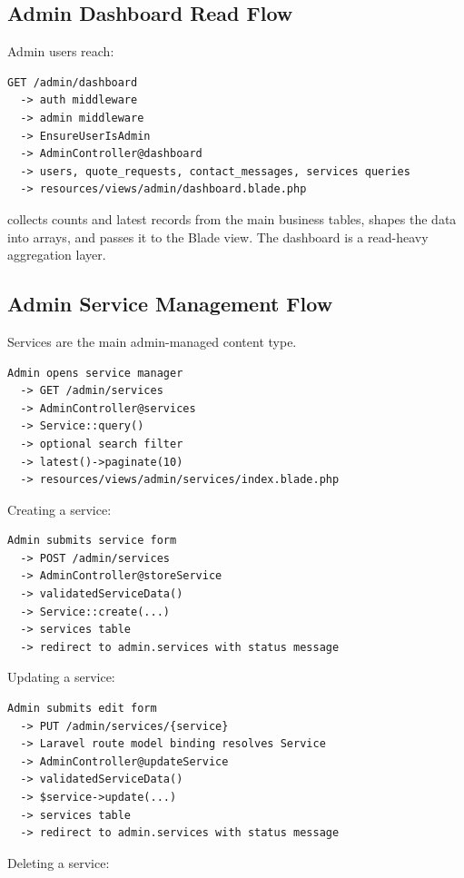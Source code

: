 \documentclass[11pt,a4paper]{article}
\begin{document}
\subsection{Admin Dashboard Read Flow}

Admin users reach:

\begin{verbatim}
GET /admin/dashboard
  -> auth middleware
  -> admin middleware
  -> EnsureUserIsAdmin
  -> AdminController@dashboard
  -> users, quote_requests, contact_messages, services queries
  -> resources/views/admin/dashboard.blade.php
\end{verbatim}

 collects counts and latest records from the main business tables, shapes the data into arrays, and passes it to the Blade view. The dashboard is a read-heavy aggregation layer.

\subsection{Admin Service Management Flow}

Services are the main admin-managed content type.

\begin{verbatim}
Admin opens service manager
  -> GET /admin/services
  -> AdminController@services
  -> Service::query()
  -> optional search filter
  -> latest()->paginate(10)
  -> resources/views/admin/services/index.blade.php
\end{verbatim}

Creating a service:

\begin{verbatim}
Admin submits service form
  -> POST /admin/services
  -> AdminController@storeService
  -> validatedServiceData()
  -> Service::create(...)
  -> services table
  -> redirect to admin.services with status message
\end{verbatim}

Updating a service:

\begin{verbatim}
Admin submits edit form
  -> PUT /admin/services/{service}
  -> Laravel route model binding resolves Service
  -> AdminController@updateService
  -> validatedServiceData()
  -> $service->update(...)
  -> services table
  -> redirect to admin.services with status message
\end{verbatim}

Deleting a service:
\end{document}

